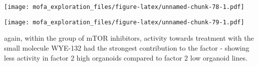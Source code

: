 \documentclass[
]{article}
\newenvironment{Shaded}{\begin{snugshade}}{\end{snugshade}}
\newcommand{\DataTypeTok}[1]{\textcolor[rgb]{0.13,0.29,0.53}{#1}}
\newcommand{\KeywordTok}[1]{\textcolor[rgb]{0.13,0.29,0.53}{\textbf{#1}}}
\newcommand{\NormalTok}[1]{#1}
\newcommand{\OperatorTok}[1]{\textcolor[rgb]{0.81,0.36,0.00}{\textbf{#1}}}
\newcommand{\OtherTok}[1]{\textcolor[rgb]{0.56,0.35,0.01}{#1}}
\newcommand{\StringTok}[1]{\textcolor[rgb]{0.31,0.60,0.02}{#1}}
\begin{document}
\texttt{[image: mofa\_exploration\_files/figure-latex/unnamed-chunk-78-1.pdf]}

\begin{Shaded}
\end{Shaded}

\texttt{[image: mofa\_exploration\_files/figure-latex/unnamed-chunk-79-1.pdf]}

again, within the group of mTOR inhibitors, activity towards treatment
with the small molecule WYE-132 had the strongest contribution to the
factor - showing less activity in factor 2 high organoids compared to
factor 2 low organoid lines.
\end{document}
